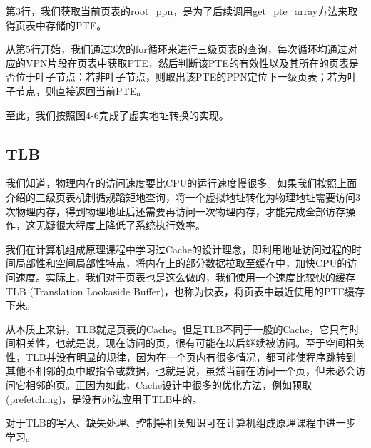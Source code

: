 第3行，我们获取当前页表的root\_ppn，是为了后续调用get\_pte\_array方法来取得页表中存储的PTE。

从第5行开始，我们通过3次的for循环来进行三级页表的查询，每次循环均通过对应的VPN片段在页表中获取PTE，然后判断该PTE的有效性以及其所在的页表是否位于叶子节点：若非叶子节点，则取出该PTE的PPN定位下一级页表；若为叶子节点，则直接返回当前PTE。

至此，我们按照图4-6完成了虚实地址转换的实现。

\subsection{TLB}

我们知道，物理内存的访问速度要比CPU的运行速度慢很多。如果我们按照上面介绍的三级页表机制循规蹈矩地查询，将一个虚拟地址转化为物理地址需要访问3次物理内存，得到物理地址后还需要再访问一次物理内存，才能完成全部访存操作，这无疑很大程度上降低了系统执行效率。

我们在计算机组成原理课程中学习过Cache的设计理念，即利用地址访问过程的时间局部性和空间局部性特点，将内存上的部分数据拉取至缓存中，加快CPU的访问速度。实际上，我们对于页表也是这么做的，我们使用一个速度比较快的缓存TLB (Translation Lookaside Buffer)，也称为快表，将页表中最近使用的PTE缓存下来。

从本质上来讲，TLB就是页表的Cache。但是TLB不同于一般的Cache，它只有时间相关性，也就是说，现在访问的页，很有可能在以后继续被访问。至于空间相关性，TLB并没有明显的规律，因为在一个页内有很多情况，都可能使程序跳转到其他不相邻的页中取指令或数据，也就是说，虽然当前在访问一个页，但未必会访问它相邻的页。正因为如此，Cache设计中很多的优化方法，例如预取 (prefetching)，是没有办法应用于TLB中的。

对于TLB的写入、缺失处理、控制等相关知识可在计算机组成原理课程中进一步学习。
